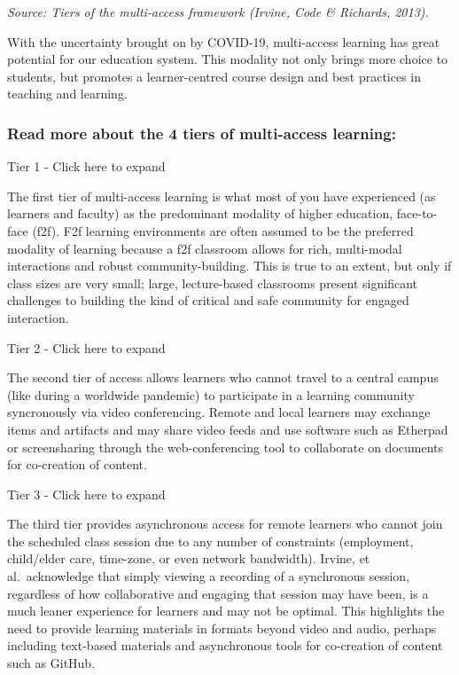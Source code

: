 \documentclass[
]{book}
\begin{document}
\emph{Source: Tiers of the multi-access framework (Irvine, Code \& Richards, 2013).}

With the uncertainty brought on by COVID-19, multi-access learning has great potential for our education system. This modality not only brings more choice to students, but promotes a learner-centred course design and best practices in teaching and learning.

\hypertarget{read-more-about-the-4-tiers-of-multi-access-learning}{%
\subsubsection*{Read more about the 4 tiers of multi-access learning:}\label{read-more-about-the-4-tiers-of-multi-access-learning}}

Tier 1 - Click here to expand

The first tier of multi-access learning is what most of you have experienced (as learners and faculty) as the predominant modality of higher education, face-to-face (f2f). F2f learning environments are often assumed to be the preferred modality of learning because a f2f classroom allows for rich, multi-modal interactions and robust community-building. This is true to an extent, but only if class sizes are very small; large, lecture-based classrooms present significant challenges to building the kind of critical and safe community for engaged interaction.

Tier 2 - Click here to expand

The second tier of access allows learners who cannot travel to a central campus (like during a worldwide pandemic) to participate in a learning community syncronously via video conferencing. Remote and local learners may exchange items and artifacts and may share video feeds and use software such as Etherpad or screensharing through the web-conferencing tool to collaborate on documents for co-creation of content.

Tier 3 - Click here to expand

The third tier provides asynchronous access for remote learners who cannot join the scheduled class session due to any number of constraints (employment, child/elder care, time-zone, or even network bandwidth). Irvine, et al.~acknowledge that simply viewing a recording of a synchronous session, regardless of how collaborative and engaging that session may have been, is a much leaner experience for learners and may not be optimal. This highlights the need to provide learning materials in formats beyond video and audio, perhaps including text-based materials and asynchronous tools for co-creation of content such as GitHub.
\end{document}
